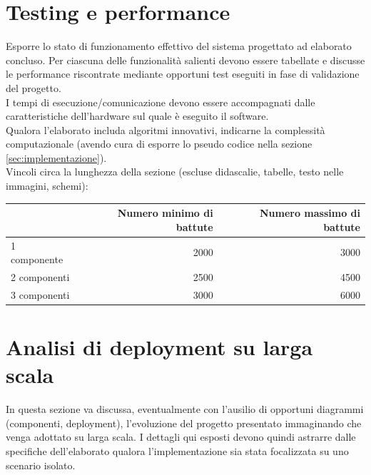 \documentclass[12pt]{article}
\begin{document}

\section{Testing e performance}

Esporre lo stato di funzionamento effettivo del sistema progettato ad elaborato concluso. Per ciascuna delle funzionalità salienti devono essere tabellate e discusse le performance riscontrate mediante opportuni test eseguiti in fase di validazione del progetto.\\

I tempi di esecuzione/comunicazione devono essere accompagnati dalle caratteristiche dell'hardware sul quale è eseguito il software.\\

Qualora l'elaborato includa algoritmi innovativi, indicarne la complessità computazionale (avendo cura di esporre lo pseudo codice nella sezione \ref{sec:implementazione}).\\


Vincoli circa la lunghezza della sezione (escluse didascalie, tabelle, testo nelle immagini, schemi):

\vspace{1cm}
\begin{tabular}{l|rr}
 & Numero minimo di battute & Numero massimo di battute \\
 \hline
 1 componente & 2000 & 3000 \\
 2 componenti & 2500 & 4500 \\
 3 componenti & 3000 & 6000 \\
 \hline
\end{tabular}


\newpage

 

\section{Analisi di deployment su larga scala}

In questa sezione va discussa, eventualmente con l'ausilio di opportuni diagrammi (componenti, deployment), l'evoluzione del progetto presentato immaginando che venga adottato su larga scala. I dettagli qui esposti devono quindi astrarre dalle specifiche dell'elaborato qualora l'implementazione sia stata focalizzata su uno scenario isolato.\\
\end{document}

